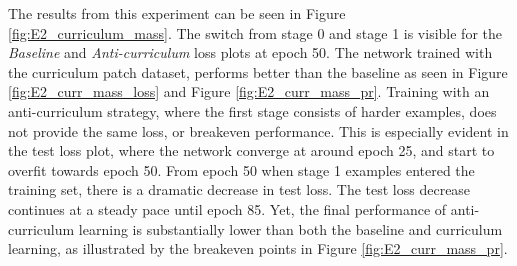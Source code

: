 The results from this experiment can be seen in Figure \ref{fig:E2_curriculum_mass}. The switch from stage 0 and stage 1 is visible for the \textit{Baseline} and \textit{Anti-curriculum} loss plots at epoch 50. The network trained with the curriculum patch dataset, performs better than the baseline as seen in Figure \ref{fig:E2_curr_mass_loss} and Figure \ref{fig:E2_curr_mass_pr}. Training with an anti-curriculum strategy, where the first stage consists of harder examples, does not provide the same loss, or breakeven performance. This is especially evident in the test loss plot, where the network converge at around epoch 25, and start to overfit towards epoch 50. From epoch 50 when stage 1 examples entered the training set, there is a dramatic decrease in test loss. The test loss decrease continues at a steady pace until epoch 85. Yet, the final performance of anti-curriculum learning is substantially lower than both the baseline and curriculum learning, as illustrated by the breakeven points in Figure \ref{fig:E2_curr_mass_pr}.\\

